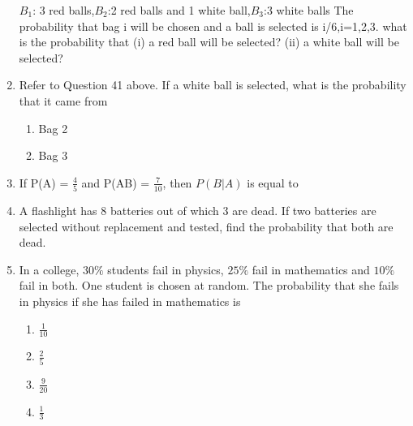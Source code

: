 \begin{enumerate}
$B_1$: 3 red balls,$B_2$:2 red balls and 1 white ball,$B_3$:3 white balls
The probability that bag i will be chosen and a ball is selected is i/6,i=1,2,3.
what is the probability that
(i) a red ball will be selected?     
(ii) a white ball will be selected?\\
\solution

\item Refer to Question 41 above. If a white ball is selected, what is the probability that it came from\\
\begin{enumerate}
\item  Bag 2
\item  Bag 3
\end{enumerate}
\solution

\item If P(A) = $\frac{4}{5}$ and P(AB) = $\frac{7}{10}$, then $P(B|A)$ is equal to\\
\solution

\item A flashlight has 8 batteries out of which 3 are dead. If two batteries are selected without replacement and tested, find the probability that both are dead.\\

\item In a college, $30\%$ students fail in physics, $25\%$ fail in mathematics and $10\%$ fail in both. One student is chosen at random. The probability that she fails in physics if she has failed in mathematics is
\begin{enumerate}
    \item $\frac{1}{10}$
    \item $\frac{2}{5}$
    \item $\frac{9}{20}$
    \item $\frac{1}{3}$
\end{enumerate}
\solution

\end{enumerate}
